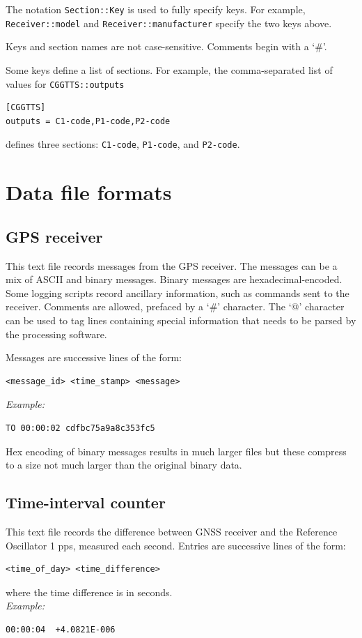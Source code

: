 \documentclass[11pt,a4paper,openany,oneside]{book}
\newcommand{\cc}[1]{{\texttt{#1}}}
\begin{document}
The notation \cc{Section::Key} is used to fully specify keys. For example,
\cc{Receiver::model} and \cc{Receiver::manufacturer} specify the two keys above.

Keys and section names are not case-sensitive. Comments begin with a `\#'.

Some keys define a list of sections. For example, the comma-separated list of values for \cc{CGGTTS::outputs} 
\begin{lstlisting}
[CGGTTS]
outputs = C1-code,P1-code,P2-code
\end{lstlisting}
defines three sections: \cc{C1-code}, \cc{P1-code}, and \cc{P2-code}.

\section{Data file formats \label{s:DataFileFormat}}

\subsection{GPS receiver}

This text file records messages from the GPS receiver. The messages can be a mix of ASCII and binary messages.
Binary messages are hexadecimal-encoded. Some logging scripts record ancillary information, 
such as commands sent to the receiver. Comments are allowed, prefaced by a `\#' character. 
The `@' character can be used to tag lines containing special information that needs to be parsed by
the processing software.

Messages are successive lines of the form:
\begin{lstlisting}
<message_id> <time_stamp> <message>
\end{lstlisting}
\textit{Example:}
\begin{lstlisting}
TO 00:00:02 cdfbc75a9a8c353fc5
\end{lstlisting}

Hex encoding of binary messages results in much larger files but these compress to a size not much larger
than the original binary data.

\subsection{Time-interval counter}

This text file records the difference between GNSS receiver and the Reference Oscillator 1 pps,
measured each second. Entries are successive lines of the form:
\begin{lstlisting}
<time_of_day> <time_difference>
\end{lstlisting}
where the time difference is in seconds.\\
\textit{Example:}
\begin{lstlisting}
00:00:04  +4.0821E-006 
\end{lstlisting}
\end{document}
